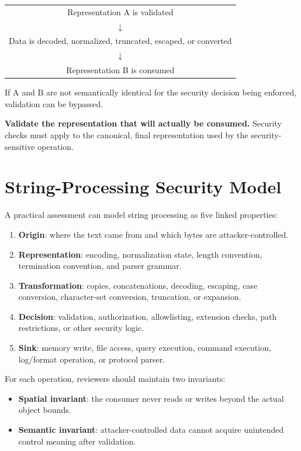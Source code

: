 \documentclass[11pt]{article}
\begin{document}
\begin{center}
\begin{tabular}{c}
Representation A is validated \\
\(\downarrow\) \\
Data is decoded, normalized, truncated, escaped, or converted \\
\(\downarrow\) \\
Representation B is consumed
\end{tabular}
\end{center}

If A and B are not semantically identical for the security decision being enforced, validation can be bypassed.

\begin{securityprinciple}
\textbf{Validate the representation that will actually be consumed.} Security checks must apply to the canonical, final representation used by the security-sensitive operation.
\end{securityprinciple}

\section{String-Processing Security Model}

A practical assessment can model string processing as five linked properties:

\begin{enumerate}
  \item \textbf{Origin}: where the text came from and which bytes are attacker-controlled.
  \item \textbf{Representation}: encoding, normalization state, length convention, termination convention, and parser grammar.
  \item \textbf{Transformation}: copies, concatenations, decoding, escaping, case conversion, character-set conversion, truncation, or expansion.
  \item \textbf{Decision}: validation, authorization, allowlisting, extension checks, path restrictions, or other security logic.
  \item \textbf{Sink}: memory write, file access, query execution, command execution, log/format operation, or protocol parser.
\end{enumerate}

For each operation, reviewers should maintain two invariants:

\begin{itemize}
  \item \textbf{Spatial invariant}: the consumer never reads or writes beyond the actual object bounds.
  \item \textbf{Semantic invariant}: attacker-controlled data cannot acquire unintended control meaning after validation.
\end{itemize}
\clearpage
\end{document}
